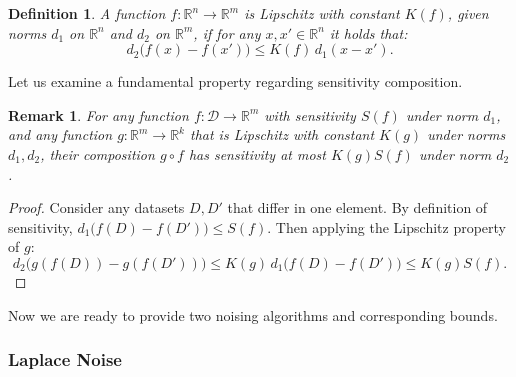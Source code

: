\documentclass[12pt,letterpaper]{article}
\newcommand{\R}{\mathbb{R}}
\newtheorem{definition}{Definition}
\newtheorem{remark}{Remark}
\begin{document}
\begin{definition}
  A function $f: \R^n \to \R^m$ is Lipschitz with constant $K(f)$, given norms $d_1$ on $\R^n$ and $d_2$ on $\R^m$, if for any $x, x' \in \R^n$ it holds that:
  $$
  d_2\big(f(x) - f(x')\big) \leq K(f)\, d_1(x - x').
  $$
\end{definition}

Let us examine a fundamental property regarding sensitivity composition.
\begin{remark}
  \label{rm:lipschitz}
For any function $f: \mathcal{D} \to \R^m$ with sensitivity $S(f)$ under norm $d_1$, and any function $g: \R^m \to \R^k$ that is Lipschitz with constant $K(g)$ under norms $d_1,d_2$, their composition $g \circ f$ has sensitivity at most $K(g)S(f)$ under norm $d_2$.
\end{remark}
\begin{proof}
  Consider any datasets $D, D'$ that differ in one element. By definition of sensitivity, $d_1\big(f(D) - f(D')\big) \leq S(f)$. Then applying the Lipschitz property of $g$:
  $$d_2\big(g(f(D)) - g(f(D'))\big) \leq K(g)\, d_1\big(f(D) - f(D')\big) \leq K(g)S(f).$$
\end{proof}


Now we are ready to provide two noising algorithms and corresponding bounds.

\subsubsection{Laplace Noise}
\end{document}
